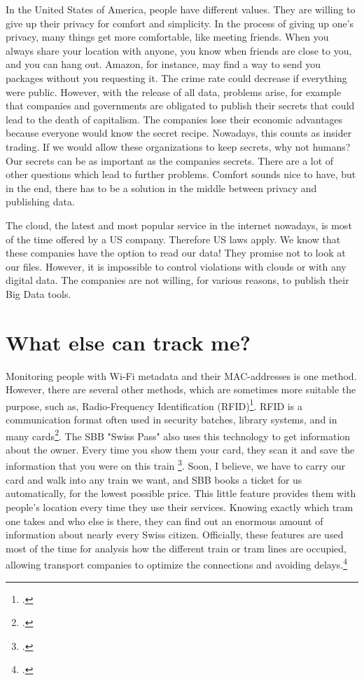 \documentclass[paper=a4, fontsize=11pt]{article}
\begin{document}
In the United States of America, people have different values. They are willing to give up their privacy for comfort and simplicity. In the process of giving up one's privacy, many things get more comfortable, like meeting friends. When you always share your location with anyone, you know when friends are close to you, and you can hang out. Amazon, for instance, may find a way to send you packages without you requesting it. The crime rate could decrease if everything were public. However, with the release of all data, problems arise, for example that companies and governments are obligated to publish their secrets that could lead to the death of capitalism. The companies lose their economic advantages because everyone would know the secret recipe. Nowadays, this counts as insider trading. If we would allow these organizations to keep secrets, why not humans? Our secrets can be as important as the companies secrets. There are a lot of other questions which lead to further problems.
Comfort sounds nice to have, but in the end, there has to be a solution in the middle between privacy and publishing data.

The cloud, the latest and most popular service in the internet nowadays, is most of the time offered by a US company. Therefore US laws apply. We know that these companies have the option to read our data! They promise not to look at our files. However, it is impossible to control violations with clouds or with any digital data. The companies are not willing, for various reasons, to publish their Big Data tools.

\section{What else can track me?}
Monitoring people with Wi-Fi metadata and their MAC-addresses is one method. However, there are several other methods, which are sometimes more suitable the purpose, such as, Radio-Frequency Identification (RFID)\footcite{studenttracking}. RFID is a communication format often used in security batches, library systems, and in many cards\footcite{datenschutzrfid}. The SBB "Swiss Pass" also uses this technology to get information about the owner. Every time you show them your card, they scan it and save the information that you were on this train \footcite{sbbdatenschutz}. Soon, I believe, we have to carry our card and walk into any train we want, and SBB books a ticket for us automatically, for the lowest possible price. This little feature provides them with people's location every time they use their services. Knowing exactly which tram one takes and who else is there, they can find out an enormous amount of information about nearly every Swiss citizen. Officially, these features are used most of the time for analysis how the different train or tram lines are occupied, allowing transport companies to optimize the connections and avoiding delays.\footcite{miningtransport}
\end{document}
